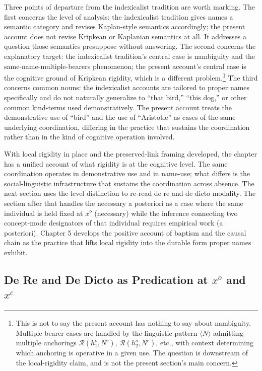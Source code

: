 \documentclass[12pt,a4paper]{article}
\begin{document}
Three points of departure from the indexicalist tradition are worth marking. The first concerns the level of analysis: the indexicalist tradition gives names a semantic category and revises Kaplan-style semantics accordingly; the present account does not revise Kripkean or Kaplanian semantics at all. It addresses a question those semantics presuppose without answering. The second concerns the explanatory target: the indexicalist tradition's central case is nambiguity and the same-name-multiple-bearers phenomenon; the present account's central case is the cognitive ground of Kripkean rigidity, which is a different problem.\footnote{This is not to say the present account has nothing to say about nambiguity. Multiple-bearer cases are handled by the linguistic pattern \(\langle N \rangle\) admitting multiple anchorings \(\mathcal{R}(h_1^o, N^c)\), \(\mathcal{R}(h_2^o, N^c)\), etc., with context determining which anchoring is operative in a given use. The question is downstream of the local-rigidity claim, and is not the present section's main concern.} The third concerns common nouns: the indexicalist accounts are tailored to proper names specifically and do not naturally generalize to ``that bird,'' ``this dog,'' or other common kind-terms used demonstratively. The present account treats the demonstrative use of ``bird'' and the use of ``Aristotle'' as cases of the same underlying coordination, differing in the practice that sustains the coordination rather than in the kind of cognitive operation involved.

With local rigidity in place and the preserved-link framing developed, the chapter has a unified account of what rigidity is at the cognitive level. The same coordination operates in demonstrative use and in name-use; what differs is the social-linguistic infrastructure that sustains the coordination across absence. The next section uses the level distinction to re-read de re and de dicto modality. The section after that handles the necessary a posteriori as a case where the same individual is held fixed at \(x^o\) (necessary) while the inference connecting two concept-mode designators of that individual requires empirical work (a posteriori). Chapter 5 develops the positive account of baptism and the causal chain as the practice that lifts local rigidity into the durable form proper names exhibit.

\subsection{\texorpdfstring{De Re and De Dicto as Predication at \(x^o\) and \(x^c\)}{De Re and De Dicto as Predication at x\^{}o and x\^{}c}}\label{de-re-and-de-dicto-as-predication-at-xo-and-xc}
\end{document}
